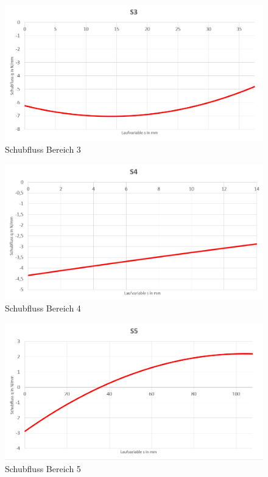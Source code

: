 \begin{figure}[h]
	\includegraphics[width=1.0\textwidth]{Bilder/S3.png}
	\caption{Schubfluss Bereich 3}
\end{figure}
\begin{figure}[h]
	\includegraphics[width=1.0\textwidth]{Bilder/S4.png}
	\caption{Schubfluss Bereich 4}
	\label{fig:S4}
\end{figure}
\begin{figure}[h]
	\includegraphics[width=1.0\textwidth]{Bilder/S5.png}
	\caption{Schubfluss Bereich 5}
\end{figure}
